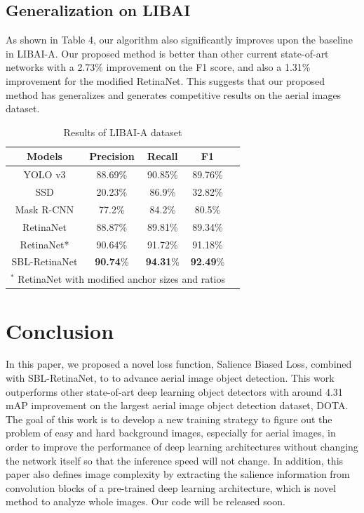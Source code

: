 \documentclass[conference]{IEEEtran}
\begin{document}
    \subsection{Generalization on LIBAI}
    As shown in Table 4, our algorithm also significantly improves upon the baseline in LIBAI-A. Our proposed method is better than other current state-of-art networks with a 2.73\% improvement on the F1 score, and also a 1.31\% improvement for the modified RetinaNet\cite{lin2017focal}. This suggests that our proposed method has generalizes and generates competitive results on the aerial images dataset.
 \begin{table}[htbp]
    	\caption{Results of LIBAI-A dataset}
    	\begin{center}
    	\begin{tabular}{|c|c|c|c|c|}
    	\hline

    	\textbf{Models}&\textbf{Precision}&\textbf{Recall}&\textbf{F1} \\ \hline
    	 YOLO v3\cite{redmon2018yolov3} &88.69\% &90.85\%&89.76\%\\
    	 SSD\cite{liu2016ssd} & 20.23\% &86.9\% &32.82\%\\
         Mask R-CNN\cite{he2017mask} &77.2\% &84.2\% &80.5\% \\

    	 RetinaNet\cite{lin2017focal} &88.87\% &89.81\% &89.34\% \\
         RetinaNet* &90.64\% &91.72\% &91.18\% \\
         SBL-RetinaNet &\textbf{90.74}\% &\textbf{94.31}\% &\textbf{92.49}\% \\ \hline 
         \multicolumn{4}{l}{$^*$ RetinaNet with modified anchor sizes and ratios}
    	\end{tabular}
    	\label{tab:final}
    	\end{center}
    \end{table}
\section{Conclusion}
    In this paper, we proposed a novel loss function, Salience Biased Loss, combined with SBL-RetinaNet, to to advance aerial image object detection. This work outperforms other state-of-art deep learning object detectors with around 4.31 mAP improvement on the largest aerial image object detection dataset, DOTA. The goal of this work is to develop a new training strategy to figure out the problem of easy and hard background images, especially for aerial images, in order to improve the performance of deep learning architectures without changing the network itself so that the inference speed will not change. In addition, this paper also defines image complexity by extracting the salience information from convolution blocks of a pre-trained deep learning architecture, which is novel method to analyze whole images. Our code will be released soon.
    
\end{document}
